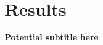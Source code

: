 \documentclass[12pt]{article}
\begin{document}
\section*{Results}


\textbf{Potential subtitle here}
\end{document}
